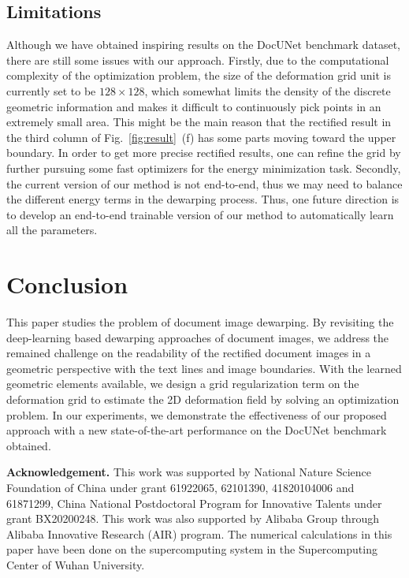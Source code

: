 \documentclass[10pt,twocolumn,letterpaper]{article}
\newcommand{\myparagraph}[1]{\vspace{1pt} \noindent \textbf{#1} }
\begin{document}
\subsection{Limitations}
Although we have obtained inspiring results on the DocUNet benchmark dataset, there are still some issues with our approach. 
Firstly, due to the computational complexity of the optimization problem, the size of the deformation grid unit is currently set to be $128 \times 128$, which somewhat limits the density of the discrete geometric information and makes it difficult to continuously pick points in an extremely small area. This might be the main reason that the rectified result in the third column of Fig.~\ref{fig:result}~(f) has some parts moving toward the upper boundary. In order to get more precise rectified results, one can refine the grid by further pursuing some fast optimizers for the energy minimization task.  
Secondly, 
the current version of our method is not end-to-end, thus we may need to balance the different energy terms in the dewarping process.
Thus, one future direction is to develop an end-to-end trainable version of our method to automatically learn all the parameters.




\section{Conclusion}
\label{sec:concl}
This paper studies the problem of document image dewarping. By revisiting the deep-learning based dewarping approaches of document images, we address the remained challenge on the readability of the rectified document images in a geometric perspective with the text lines and image boundaries. With the learned geometric elements available, we design a grid regularization term on the deformation grid to estimate the 2D deformation field by solving an optimization problem. In our experiments, we demonstrate the effectiveness of our proposed approach with a new state-of-the-art performance on the DocUNet benchmark obtained.

\myparagraph{Acknowledgement.}
This work was supported by National Nature Science Foundation of China under grant 61922065, 62101390, 41820104006 and 61871299, China National Postdoctoral Program for Innovative Talents under grant BX20200248. This work was also supported by Alibaba Group through Alibaba Innovative Research (AIR) program.
The numerical calculations in this paper have been done on the supercomputing system in the Supercomputing Center of Wuhan University.







 











{\small


}
\end{document}

